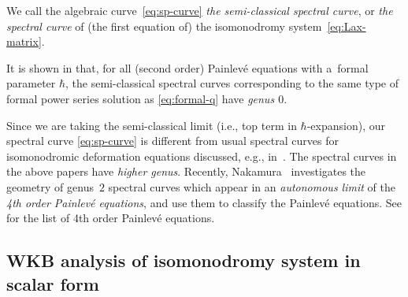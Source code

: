 \begin{Def}
We call the algebraic curve~\eqref{eq:sp-curve}
{\em the semi-classical spectral curve}, or
{\em the spectral curve}
of (the f\/irst equation of) the isomonodromy system~\eqref{eq:Lax-matrix}.
\end{Def}

\begin{rem}
It is shown in \cite[Proposition~1.3]{KT-PI} that, for all (second order)
Painlev\'e equations with a~formal parameter $\hbar$,
the semi-classical spectral curves corresponding to
the same type of formal power series solution
as \eqref{eq:formal-q} have {\em genus $0$}.
\end{rem}

\begin{rem}
Since we are taking the semi-classical limit
(i.e., top term in $\hbar$-expansion),
our spectral curve \eqref{eq:sp-curve} is dif\/ferent from
usual spectral curves for isomonodromic deformation equations
discussed, e.g., in~\cite{Olsha, Takasaki}.
The spectral curves in the above papers have {\em higher genus}.
Recently, Nakamura~\cite{Nakamura} investigates
the geometry of genus~$2$ spectral curves which appear
in an {\em autonomous limit} of the
{\em 4th order Painlev\'e equations},
and use them to classify the Painlev\'e equations.
See \cite{KNS} for the list of 4th order Painlev\'e equations.
\end{rem}

\subsection{WKB analysis of isomonodromy system in scalar form}
\label{subsection:WKB-for-scalar-Lax}

